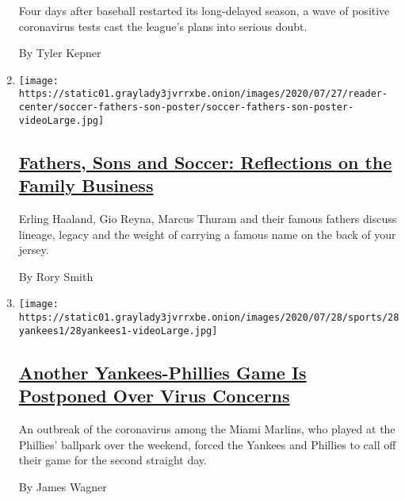\begin{enumerate}
  Four days after baseball restarted its long-delayed season, a wave of
  positive coronavirus tests cast the league's plans into serious doubt.

  By Tyler Kepner
\item
  \texttt{[image: https://static01.graylady3jvrrxbe.onion/images/2020/07/27/reader-center/soccer-fathers-son-poster/soccer-fathers-son-poster-videoLarge.jpg]}

  \hypertarget{fathers-sons-and-soccer-reflections-on-the-family-business}{%
  \subsection{\texorpdfstring{\href{/2020/07/28/sports/soccer/erling-haaland-gio-reyna-thuram.html}{Fathers,
  Sons and Soccer: Reflections on the Family
  Business}}{Fathers, Sons and Soccer: Reflections on the Family Business}}\label{fathers-sons-and-soccer-reflections-on-the-family-business}}

  Erling Haaland, Gio Reyna, Marcus Thuram and their famous fathers
  discuss lineage, legacy and the weight of carrying a famous name on
  the back of your jersey.

  By Rory Smith
\item
  \texttt{[image: https://static01.graylady3jvrrxbe.onion/images/2020/07/28/sports/28yankees1/28yankees1-videoLarge.jpg]}

  \hypertarget{another-yankees-phillies-game-is-postponed-over-virus-concerns}{%
  \subsection{\texorpdfstring{\href{/2020/07/28/sports/baseball/yankees-phillies-postponed.html}{Another
  Yankees-Phillies Game Is Postponed Over Virus
  Concerns}}{Another Yankees-Phillies Game Is Postponed Over Virus Concerns}}\label{another-yankees-phillies-game-is-postponed-over-virus-concerns}}

  An outbreak of the coronavirus among the Miami Marlins, who played at
  the Phillies' ballpark over the weekend, forced the Yankees and
  Phillies to call off their game for the second straight day.

  By James Wagner
\end{enumerate}

